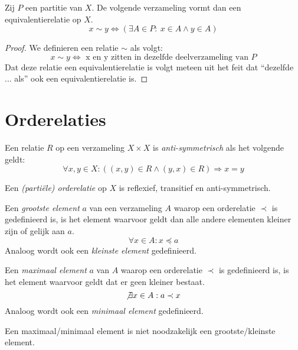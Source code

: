 \documentclass[main.tex]{subfiles}
\begin{document}
\begin{st}
  \label{st:partitie-equivalentierelatie}
  Zij $P$ een partitie van $X$.
  De volgende verzameling vormt dan een equivalentierelatie op $X$.
  \[ x \sim y \Leftrightarrow (\exists A \in P:\ x \in A \wedge y \in A )\]

  \begin{proof}
    We definieren een relatie $\sim$ als volgt:
    \[
    x \sim y \Leftrightarrow \text{ x en y zitten in dezelfde deelverzameling van } P
    \]
    Dat deze relatie een equivalentierelatie is volgt meteen uit het feit dat ``dezelfde ... als'' ook een equivalentierelatie is.
  \end{proof}
\end{st}

\section{Orderelaties}
\label{sec:orderelaties}

\begin{de}
  Een relatie $R$ op een verzameling $X \times X$ is \emph{anti-symmetrisch} als het volgende geldt:
  \[ \forall x,y \in X: ((x,y) \in R \wedge (y,x) \in R) \Rightarrow x = y \]
\end{de}

\begin{de}
  Een \emph{(parti\"ele) orderelatie} op $X$ is reflexief, transitief en anti-symmetrisch.
\end{de}

\begin{de}
  Een \emph{grootste element} $a$ van een verzameling $A$ waarop een orderelatie $\prec$ is gedefinieerd is, is het element waarvoor geldt dan alle andere elementen kleiner zijn of gelijk aan $a$.
  \[ \forall x \in A: x \preceq a \] 
  Analoog wordt ook een \emph{kleinste element} gedefinieerd.
\end{de}

\begin{de}
  Een \emph{maximaal element} $a$ van $A$ waarop een orderelatie $\prec$ is gedefinieerd is, is het element waarvoor geldt dat er geen kleiner bestaat.
  \[ \not\exists x \in A: a \prec x \]
  Analoog wordt ook een \emph{minimaal element} gedefinieerd.
\end{de}

\begin{opm}
  Een maximaal/minimaal element is niet noodzakelijk een grootste/kleinste element.    
\end{opm}
\end{document}
